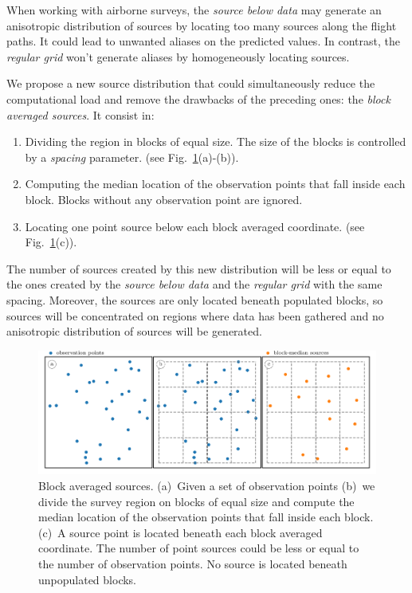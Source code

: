 \documentclass[twocolumn]{article}
\begin{document}
When working with airborne surveys, the \emph{source below data} may
generate an anisotropic distribution of sources by locating too many sources
along the flight paths.
It could lead to unwanted aliases on the predicted values.
In contrast, the \emph{regular grid} won't generate aliases by homogeneously
locating sources.

We propose a new source distribution that could simultaneously reduce the
computational load and remove the drawbacks of the preceding ones: the
\emph{block averaged sources}.
It consist in:

\begin{enumerate}
    \item Dividing the region in blocks of equal size. The size of the blocks
        is controlled by a \emph{spacing} parameter.
        (see Fig.~\ref{fig:block-median-sources}(a)-(b)).
    \item Computing the median location of the observation points that fall
        inside each block. Blocks without any observation point are ignored.
    \item Locating one point source below each block averaged coordinate.
        (see Fig.~\ref{fig:block-median-sources}(c)).
\end{enumerate}

The number of sources created by this new distribution will be less or equal to
the ones created by the \emph{source below data} and the \emph{regular
grid} with the same spacing.
Moreover, the sources are only located beneath populated blocks, so sources
will be concentrated on regions where data has been gathered and no anisotropic
distribution of sources will be generated.

\begin{figure}
    \includegraphics[width=\linewidth]{figs/block-median-sources-schematics.pdf}
    \caption{
        Block averaged sources.
        (a)~Given a set of observation points
        (b)~we divide the survey region on blocks of equal size and compute the
            median location of the observation points that fall inside each
            block.
        (c)~A source point is located beneath each block averaged coordinate.
            The number of point sources could be less or equal to the number of
            observation points. No source is located beneath unpopulated
            blocks.
    }
    \label{fig:block-median-sources}
\end{figure}
\end{document}
